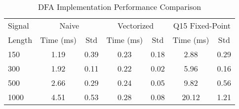 
\begin{table}[htbp]
\centering
\caption{DFA Implementation Performance Comparison}
\label{tab:dfa_performance}
\begin{tabular}{lcccccc}
\toprule
Signal & \multicolumn{2}{c}{Naive} & \multicolumn{2}{c}{Vectorized} & \multicolumn{2}{c}{Q15 Fixed-Point} \\
\cmidrule(lr){2-3} \cmidrule(lr){4-5} \cmidrule(lr){6-7}
Length & Time (ms) & Std & Time (ms) & Std & Time (ms) & Std \\
\midrule
150 & 1.19 & 0.39 & 0.23 & 0.18 & 2.88 & 0.29 \\
300 & 1.92 & 0.11 & 0.22 & 0.02 & 5.96 & 0.16 \\
500 & 2.66 & 0.29 & 0.24 & 0.05 & 9.82 & 0.56 \\
1000 & 4.51 & 0.53 & 0.28 & 0.08 & 20.12 & 1.21 \\
\bottomrule
\end{tabular}
\end{table}
